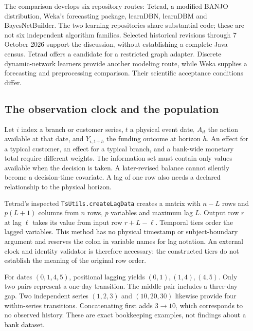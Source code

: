 The comparison develops six repository routes: Tetrad, a modified BANJO
distribution, Weka's forecasting package, learnDBN, learnDBM and
BayesNetBuilder. The two learning repositories share substantial code; these
are not six independent algorithm families. Selected historical revisions
through 7 October 2026 support the discussion, without establishing a complete
Java census. Tetrad offers a candidate for a restricted graph adapter. Discrete
dynamic-network learners provide another modeling route, while Weka supplies
a forecasting and preprocessing comparison. Their scientific acceptance
conditions differ.~\citep{exec15_javatemporal_tetrad,exec15_javatemporal_banjo,
exec15_javatemporal_weka,exec15_javatemporal_learndbn,
exec15_javatemporal_learndbm,exec15_javatemporal_builder}

\subsection{The observation clock and the population}

Let $i$ index a branch or customer series, $t$ a physical event date, $A_{it}$
the action available at that date, and $Y_{i,t+h}$ the funding outcome at horizon
$h$. An effect for a typical customer, an effect for a typical branch, and a
bank-wide monetary total require different weights. The information set must
contain only values available when the decision is taken. A later-revised
balance cannot silently become a decision-time covariate. A lag of one row
also needs a declared relationship to the physical horizon.

Tetrad's inspected \texttt{TsUtils.createLagData} creates a matrix with $n-L$
rows and $p(L+1)$ columns from $n$ rows, $p$ variables and maximum lag $L$.
Output row $r$ at lag $\ell$ takes its value from input row $r+L-\ell$.
Temporal tiers order the lagged variables. This method has no physical
timestamp or subject-boundary argument and reserves the colon in variable
names for lag notation. An external clock and identity validator is therefore
necessary: the constructed tiers do not establish the meaning of the original
row order.~\citep{exec15_javatemporal_tetrad}

For dates $(0,1,4,5)$, positional lagging yields $(0,1),(1,4),(4,5)$. Only two
pairs represent a one-day transition. The middle pair includes a three-day
gap. Two independent series $(1,2,3)$ and $(10,20,30)$ likewise provide four
within-series transitions. Concatenating first adds $3\rightarrow10$, which
corresponds to no observed history. These are exact bookkeeping examples,
not findings about a bank dataset.~\citep{exec15_javatemporal_exact}

